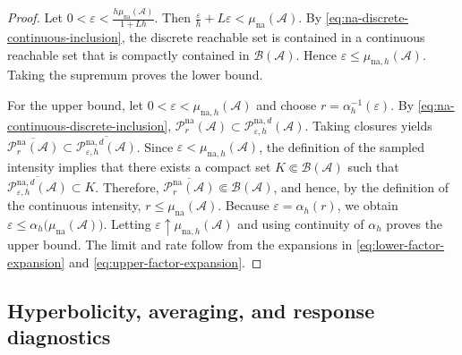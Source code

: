 \documentclass[pdflatex,sn-mathphys-num]{sn-jnl}
\numberwithin{equation}{section}
\theoremstyle{thmstyleone}%
\theoremstyle{definition}
\theoremstyle{remark}
\begin{document}
\begin{proof}
Let
    $0<\varepsilon
    <
    \frac{
        h\mu_{\mathrm{na}}(\mathcal A)
    }{1+Lh}$.
Then
    $\frac{\varepsilon}{h}+L\varepsilon
    <
    \mu_{\mathrm{na}}(\mathcal A)$.
By \eqref{eq:na-discrete-continuous-inclusion}, the discrete reachable set is contained in a continuous reachable set that is compactly contained in $\mathcal B(\mathcal A)$. Hence $\varepsilon \leq \mu_{\mathrm{na},h}(\mathcal A)$. Taking the supremum proves the lower bound.

For the upper bound, let $0<\varepsilon<\mu_{\mathrm{na},h}(\mathcal A)$ and choose $r=\alpha_h^{-1}(\varepsilon)$. By \eqref{eq:na-continuous-discrete-inclusion},
$\mathcal P_r^{\mathrm{na}}(\mathcal A) \subset \mathcal P_{\varepsilon,h}^{\mathrm{na},d}(\mathcal A)$.
Taking closures yields $\overline{\mathcal P_r^{\mathrm{na}}(\mathcal A)} \subset \overline{\mathcal P_{\varepsilon,h}^{\mathrm{na},d}(\mathcal A)}$. Since $\varepsilon<\mu_{\mathrm{na},h}(\mathcal A)$,
the definition of the sampled intensity implies that there exists a compact set $K\Subset\mathcal B(\mathcal A)$ such that $\overline{\mathcal P_{\varepsilon,h}^{\mathrm{na},d}(\mathcal A)}\subset K$. Therefore, $\overline{\mathcal P_r^{\mathrm{na}}(\mathcal A)}\Subset \mathcal B(\mathcal A)$, and hence, by the definition of the continuous intensity, $r\leq\mu_{\mathrm{na}}(\mathcal A)$. Because $\varepsilon=\alpha_h(r)$, we obtain $\varepsilon \leq \alpha_h \bigl(\mu_{\mathrm{na}}(\mathcal A)\bigr)$. Letting $\varepsilon\uparrow\mu_{\mathrm{na},h}(\mathcal A)$ and using continuity of $\alpha_h$ proves the upper bound. The limit and rate follow from the expansions in \eqref{eq:lower-factor-expansion} and \eqref{eq:upper-factor-expansion}.
\end{proof}

\subsection{Hyperbolicity, averaging, and response diagnostics}
\label{subsec:averaging-limitations}
\end{document}
